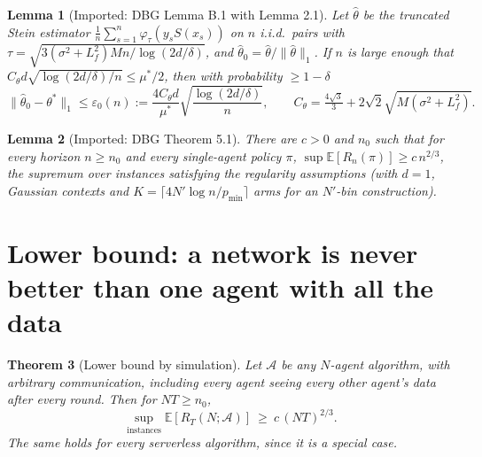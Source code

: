 \documentclass[11pt]{article}
\newtheorem{theorem}{Theorem}
\newtheorem{lemma}[theorem]{Lemma}
\theoremstyle{definition}
\newcommand{\E}{\mathbb{E}}
\newcommand{\eps}{\varepsilon}
\begin{document}
\begin{lemma}[Imported: DBG Lemma B.1 with Lemma 2.1]\label{lem:stein}
Let $\hat\theta$ be the truncated Stein estimator $\frac1n\sum_{s=1}^n\varphi_\tau(y_sS(x_s))$
on $n$ i.i.d.\ pairs with $\tau=\sqrt{3(\sigma^2+L_f^2)Mn/\log(2d/\delta)}$, and
$\hat\theta_0=\hat\theta/\|\hat\theta\|_1$. If $n$ is large enough that
$C_\theta d\sqrt{\log(2d/\delta)/n}\le\mu^*/2$, then with probability $\ge1-\delta$
\[
\|\hat\theta_0-\theta^*\|_1\le\eps_0(n):=\frac{4C_\theta d}{\mu^*}\sqrt{\frac{\log(2d/\delta)}{n}},
\qquad C_\theta=\tfrac{4\sqrt3}{3}+2\sqrt2\sqrt{M(\sigma^2+L_f^2)}.
\]
\end{lemma}

\begin{lemma}[Imported: DBG Theorem 5.1]\label{lem:dbglower}
There are $c>0$ and $n_0$ such that for every horizon $n\ge n_0$ and every single-agent policy
$\pi$, $\sup\E[R_n(\pi)]\ge c\,n^{2/3}$, the supremum over instances satisfying the regularity
assumptions (with $d=1$, Gaussian contexts and $K=\lceil 4N'\log n/p_{\min}\rceil$ arms for an
$N'$-bin construction).
\end{lemma}

\section{Lower bound: a network is never better than one agent with all the data}

\begin{theorem}[Lower bound by simulation]\label{thm:lower}
Let $\mathcal A$ be any $N$-agent algorithm, with arbitrary communication, including every agent
seeing every other agent's data after every round. Then for $NT\ge n_0$,
\[
\sup_{\text{instances}}\E[R_T(N;\mathcal A)]\ \ge\ c\,(NT)^{2/3}.
\]
The same holds for every serverless algorithm, since it is a special case.
\end{theorem}
\end{document}
